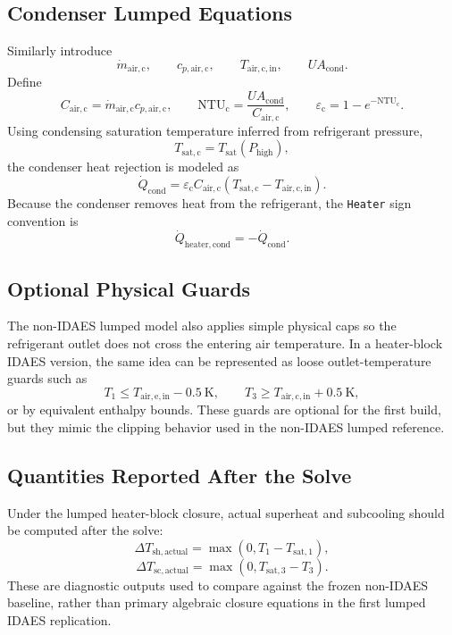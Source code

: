 \documentclass[11pt]{article}
\begin{document}
\subsection{Condenser Lumped Equations}
Similarly introduce
\begin{equation}
\dot{m}_{\mathrm{air,c}}, \qquad
c_{p,\mathrm{air,c}}, \qquad
T_{\mathrm{air,c,in}}, \qquad
UA_{\mathrm{cond}}.
\end{equation}
Define
\begin{equation}
C_{\mathrm{air,c}} = \dot{m}_{\mathrm{air,c}} c_{p,\mathrm{air,c}},
\qquad
\mathrm{NTU}_{\mathrm{c}} = \frac{UA_{\mathrm{cond}}}{C_{\mathrm{air,c}}},
\qquad
\varepsilon_{\mathrm{c}} = 1 - e^{-\mathrm{NTU}_{\mathrm{c}}}.
\end{equation}
Using condensing saturation temperature inferred from refrigerant pressure,
\begin{equation}
T_{\mathrm{sat,c}} = T_{\mathrm{sat}}(P_{\mathrm{high}}),
\end{equation}
the condenser heat rejection is modeled as
\begin{equation}
\dot{Q}_{\mathrm{cond}} =
\varepsilon_{\mathrm{c}} C_{\mathrm{air,c}}
\left(T_{\mathrm{sat,c}} - T_{\mathrm{air,c,in}}\right).
\end{equation}
Because the condenser removes heat from the refrigerant, the \texttt{Heater}
sign convention is
\begin{equation}
\dot{Q}_{\mathrm{heater,cond}} = -\dot{Q}_{\mathrm{cond}}.
\end{equation}

\subsection{Optional Physical Guards}
The non-IDAES lumped model also applies simple physical caps so the refrigerant
outlet does not cross the entering air temperature. In a heater-block IDAES
version, the same idea can be represented as loose outlet-temperature guards such as
\begin{equation}
T_1 \le T_{\mathrm{air,e,in}} - 0.5~\mathrm{K},
\qquad
T_3 \ge T_{\mathrm{air,c,in}} + 0.5~\mathrm{K},
\end{equation}
or by equivalent enthalpy bounds. These guards are optional for the first build,
but they mimic the clipping behavior used in the non-IDAES lumped reference.

\subsection{Quantities Reported After the Solve}
Under the lumped heater-block closure, actual superheat and subcooling should be
computed after the solve:
\begin{equation}
\Delta T_{\mathrm{sh,actual}} =
\max\!\left(0, T_1 - T_{\mathrm{sat},1}\right),
\end{equation}
\begin{equation}
\Delta T_{\mathrm{sc,actual}} =
\max\!\left(0, T_{\mathrm{sat},3} - T_3\right).
\end{equation}
These are diagnostic outputs used to compare against the frozen non-IDAES
baseline, rather than primary algebraic closure equations in the first lumped
IDAES replication.
\end{document}

